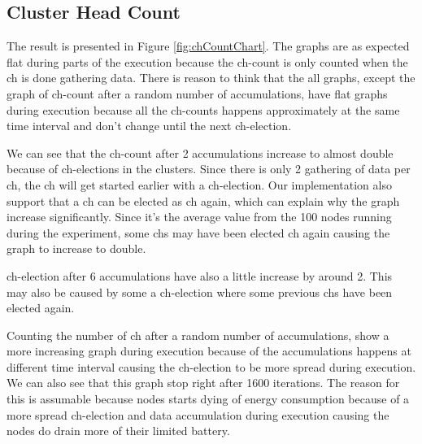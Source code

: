 \documentclass[USenglish]{uit-thesis}
\begin{document}
\newpage

\subsection{Cluster Head Count}

The result is presented in Figure \ref{fig:chCountChart}. The graphs are as expected flat during parts of the execution because the \gls{ch}-count is only counted when the \gls{ch} is done gathering data.
There is reason to think that the all graphs, except the graph of \gls{ch}-count after a random number of accumulations, have flat graphs during execution because all the \gls{ch}-counts happens approximately at the same time interval and don't change until the next \gls{ch}-election.

We can see that the \gls{ch}-count after 2 accumulations increase to almost double  because of \gls{ch}-elections in the clusters. Since there is only 2 gathering of data per \gls{ch}, the \gls{ch} will get started earlier with a \gls{ch}-election. Our implementation also support that a \gls{ch} can be elected as \gls{ch} again, which can explain why the graph increase significantly. Since it's the average value from the 100 nodes running during the experiment, some \glspl{ch} may have been elected \gls{ch} again causing the graph to increase to double.


\gls{ch}-election after 6 accumulations have also a little increase by around 2. This may also be caused by some a \gls{ch}-election where some previous \glspl{ch} have been elected again. 


Counting the number of \gls{ch} after a random number of accumulations, show a more increasing graph during execution because of the accumulations happens at different time interval causing the \gls{ch}-election to be more spread during execution. We can also see that this graph stop right after 1600 iterations. The reason for this is assumable because nodes starts dying of energy consumption because of a more spread \gls{ch}-election and data accumulation during execution causing the nodes do drain more of their limited battery.
\end{document}
